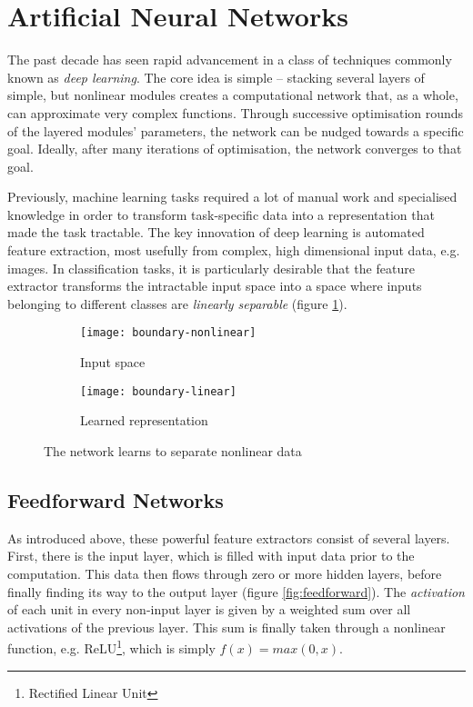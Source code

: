 \documentclass[../../report.tex]{subfiles}
\begin{document}
\section{Artificial Neural Networks}

The past decade has seen rapid advancement in a class of techniques commonly
known as \emph{deep learning}. The core idea is simple -- stacking several
layers of simple, but nonlinear modules creates a computational network that, as
a whole, can approximate very complex functions. Through successive optimisation
rounds of the layered modules' parameters, the network can be nudged towards a
specific goal. Ideally, after many iterations of optimisation, the network
converges to that goal.

Previously, machine learning tasks required a lot of manual work and specialised
knowledge in order to transform task-specific data into a representation that
made the task tractable. The key innovation of deep learning is automated
feature extraction, most usefully from complex, high dimensional input data,
e.g. images. In classification tasks, it is particularly desirable that the
feature extractor transforms the intractable input space into a space where
inputs belonging to different classes are \emph{linearly separable} (figure
\ref{fig:representation-learning}). \cite{LeCun2015}

\begin{figure}
  \centering
  \begin{subfigure}[b]{0.49\textwidth}
    \texttt{[image: boundary-nonlinear]}
    \caption{Input space}
  \end{subfigure}
  \hfill
  \begin{subfigure}[b]{0.49\textwidth}
    \texttt{[image: boundary-linear]}
    \caption{Learned representation}
  \end{subfigure}
  \caption{The network learns to separate nonlinear data \cite{Olah2014}}
  \label{fig:representation-learning}
\end{figure}

\subsection{Feedforward Networks}

As introduced above, these powerful feature extractors consist of several
layers. First, there is the input layer, which is filled with input data prior
to the computation. This data then flows through zero or more hidden layers,
before finally finding its way to the output layer (figure
\ref{fig:feedforward}). The \emph{activation} of each unit in every non-input
layer is given by a weighted sum over all activations of the previous layer.
This sum is finally taken through a nonlinear function, e.g.
ReLU\footnote{Rectified Linear Unit}, which is simply $f(x) = max(0, x)$.
\end{document}
